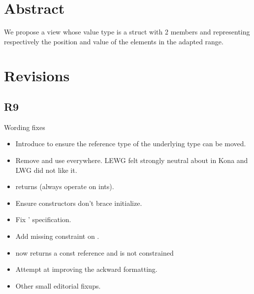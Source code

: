 \documentclass{wg21}
\title{\tcode{views::enumerate}}
\author{Corentin Jabot}{corentin.jabot@gmail.com}
\begin{document}
\maketitle
{}

\section{Abstract}

We propose a view  whose value type is a struct with 2 members  and 
representing respectively the position and value of the elements in the adapted range.

\section{Revisions}

\subsection{R9}
Wording fixes
\begin{itemize}
    \item Introduce  to ensure the reference type of the underlying type can be moved.
    \item Remove  and use  everywhere. LEWG felt strongly neutral
    about  in Kona and LWG did not like it.
    \item {} returns  (always operate on ints).
    \item Ensure constructors don't brace initialize.
    \item Fix '  specification.
    \item Add missing constraint on .
    \item {} now returns a const reference and is not constrained
    \item Attempt at improving the ackward formatting.
    \item Other small editorial fixups.
\end{itemize}
\end{document}
